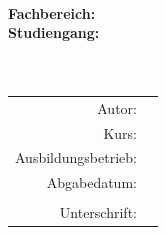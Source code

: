\thispagestyle{plain}

\begin{titlepage}
	\enlargethispage{4.0cm}

	\begin{center}		
		\hfill
		\\
		\vspace{3cm}
		\large{\textbf{Fachbereich: \studienbereich}}\\
		\vspace{0.5cm}
		\large{\textbf{Studiengang: \studiengang}}\\
		\vspace{1.0cm}
		\Large{\textsc{\textbf{\titel}}}\\
		\vspace{1.0cm}
		\large{\textbf{\art}}\\
		\vspace{1cm}
		\vspace{1cm}
		\vspace{3cm}
		\begin{tabular}{rl}
			Autor:					& \verfasser\\
			Kurs: 					& \kurs\\ 
			Ausbildungsbetrieb:		& \ausbildungsbetrieb\\ 
			Abgabedatum:		& \abgabedatum\\
			\vspace{0.5cm}\\
			Unterschrift:				& \unterschrift\\
		\end{tabular} 
	\end{center}
\end{titlepage}